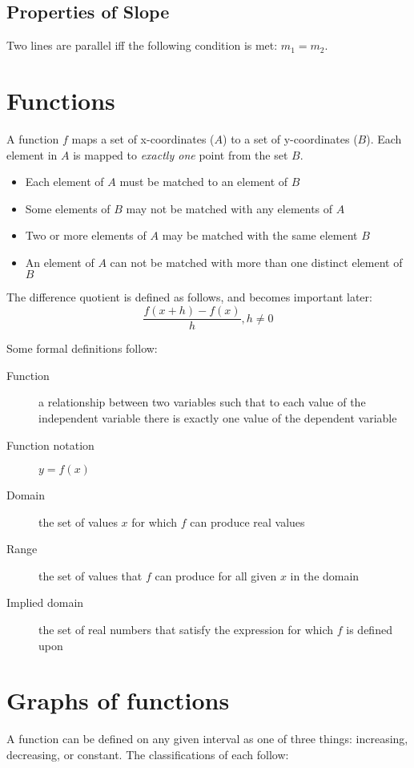 \subsection{Properties of Slope}
Two lines are parallel iff the following condition is met: $m_1=m_2$.

\section{Functions}
A function $f$ maps a set of x-coordinates ($A$) to a set of y-coordinates
($B$).  Each element in $A$ is mapped to \textit{exactly one} point from the set
$B$.

\begin{itemize}
\item{Each element of $A$ must be matched to an element of $B$}
\item{Some elements of $B$ may not be matched with any elements of $A$}
\item{Two or more elements of $A$ may be matched with the same element $B$}
\item{An element of $A$ can not be matched with more than one distinct element
of $B$}
\end{itemize}

The difference quotient is defined as follows, and becomes important later:
\begin{equation}
\frac{f(x+h)-f(x)}{h}, h \ne 0
\end{equation}

Some formal definitions follow:
\begin{description}
\item[Function]{a relationship between two variables such that to each value of
the independent variable there is exactly one value of the dependent variable}
\item[Function notation]{$y=f(x)$}
\item[Domain]{the set of values $x$ for which $f$ can produce real values}
\item[Range]{the set of values that $f$ can produce for all given $x$ in the
domain}
\item[Implied domain]{the set of real numbers that satisfy the expression for
which $f$ is defined upon}
\end{description}

\section{Graphs of functions}
A function can be defined on any given interval as one of three things:
increasing, decreasing, or constant. The classifications of each follow:

